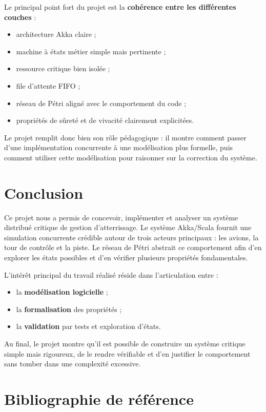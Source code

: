 \documentclass[11pt,a4paper]{article}
\begin{document}
Le principal point fort du projet est la \textbf{cohérence entre les différentes couches} :
\begin{itemize}
    \item architecture Akka claire ;
    \item machine à états métier simple mais pertinente ;
    \item ressource critique bien isolée ;
    \item file d'attente FIFO ;
    \item réseau de Pétri aligné avec le comportement du code ;
    \item propriétés de sûreté et de vivacité clairement explicitées.
\end{itemize}

Le projet remplit donc bien son rôle pédagogique : il montre comment passer d'une implémentation concurrente à une modélisation plus formelle, puis comment utiliser cette modélisation pour raisonner sur la correction du système.

\section{Conclusion}

Ce projet nous a permis de concevoir, implémenter et analyser un système distribué critique de gestion d'atterrissage. Le système Akka/Scala fournit une simulation concurrente crédible autour de trois acteurs principaux : les avions, la tour de contrôle et la piste. Le réseau de Pétri abstrait ce comportement afin d'en explorer les états possibles et d'en vérifier plusieurs propriétés fondamentales.

L'intérêt principal du travail réalisé réside dans l'articulation entre :
\begin{itemize}
    \item la \textbf{modélisation logicielle} ;
    \item la \textbf{formalisation} des propriétés ;
    \item la \textbf{validation} par tests et exploration d'états.
\end{itemize}

Au final, le projet montre qu'il est possible de construire un système critique simple mais rigoureux, de le rendre vérifiable et d'en justifier le comportement sans tomber dans une complexité excessive.


\section*{Bibliographie de référence}
\end{document}
